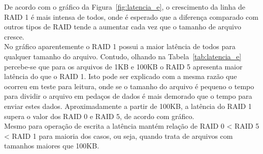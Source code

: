 	De acordo com o gráfico da Figura~\ref{fig:latencia_e}, o crescimento da linha de RAID 1 é mais intensa de todos, onde é esperado que a diferença comparado com outros tipos de RAID tende a aumentar cada vez que o tamanho de arquivo cresce.
	\\
	
	No gráfico aparentemente o RAID 1 possui a maior latência de todos para qualquer tamanho do arquivo. Contudo, olhando na Tabela~\ref{tab:latencia_e} percebe-se que para os arquivos de 1KB e 100KB o RAID 5 apresenta maior latência do que o RAID 1. Isto pode ser explicado com a mesma razão que ocorreu em teste para leitura, onde se o tamanho do arquivo é pequeno o tempo para dividir o arquivo em pedaços de dados é mais demorado que o tempo para enviar estes dados. Aproximadamente a partir de 100KB, a latência do RAID 1 supera o valor dos RAID 0 e RAID 5, de acordo com gráfico. 
	\\
	
	Mesmo para operação de escrita a latência mantém relação de RAID 0 < RAID 5 < RAID 1 para maioria dos casos, ou seja, quando trata de arquivos com tamanhos maiores que 100KB.
	\\
	
